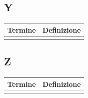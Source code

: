 \documentclass[10pt]{article}
\begin{document}
\subsection{Y} %
\begin{tabularx}{\textwidth}{|>{\centering\arraybackslash}l|X|}
\hline
\rowcolor[gray]{0.8}
\textbf{Termine} & \textbf{Definizione}\\
\hline
 & \\
\hline
\end{tabularx}

\subsection{Z} %
\begin{tabularx}{\textwidth}{|>{\centering\arraybackslash}l|X|}
\hline
\rowcolor[gray]{0.8}
\textbf{Termine} & \textbf{Definizione}\\
\hline
 & \\
\hline
\end{tabularx}
\end{document}
